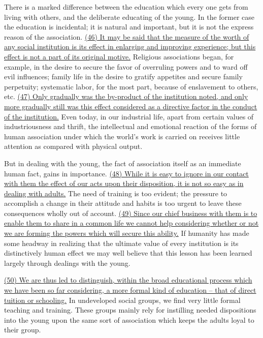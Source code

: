 
\qquad There is a marked difference between the education which every one gets from living with others, and the deliberate educating of the young. In the former case the education is incidental; it is natural and important, but it is not the express reason of the association. \ul{(46) It may be said that the measure of the worth of any social institution is its effect in enlarging and improving experience; but this effect is not a part of its original motive.} Religious associations began, for example, in the desire to secure the favor of overruling powers and to ward off evil influences; family life in the desire to gratify appetites and secure family perpetuity; systematic labor, for the most part, because of enslavement to others, etc. \ul{(47) Only gradually was the by-product of the institution noted, and only more gradually still was this effect considered as a directive factor in the conduct of the institution.} Even today, in our industrial life, apart from certain values of industriousness and thrift, the intellectual and emotional reaction of the forms of human association under which the world's work is carried on receives little attention as compared with physical output.

\qquad But in dealing with the young, the fact of association itself as an immediate human fact, gains in importance. \ul{(48) While it is easy to ignore in our contact with them the effect of our acts upon their disposition, it is not so easy as in dealing with adults.} The need of training is too evident; the pressure to accomplish a change in their attitude and habits is too urgent to leave these consequences wholly out of account. \ul{(49) Since our chief business with them is to enable them to share in a common life we cannot help considering whether or not we are forming the powers which will secure this ability.} If humanity has made some headway in realizing that the ultimate value of every institution is its distinctively human effect we may well believe that this lesson has been learned largely through dealings with the young.

\qquad \ul{(50) We are thus led to distinguish, within the broad educational process which we have been so far considering, a more formal kind of education -- that of direct tuition or schooling.} In undeveloped social groups, we find very little formal teaching and training. These groups mainly rely for instilling needed dispositions into the young upon the same sort of association which keeps the adults loyal to their group.